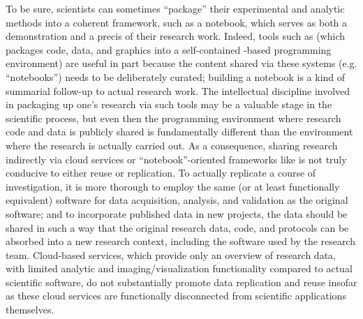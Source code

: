 \documentclass[11pt,letterpaper]{article}
\newcommand{\Jupyter}{\resizebox{!}{7pt}{\AcronymText{Jupyter}}}
\newcommand{\Python}{\resizebox{!}{7pt}{\AcronymText{Python}}}
\newcommand{\textscc}[1]{{\color{orr!35!black}{{%
						\fontfamily{Cabin-TLF}\fontseries{b}\selectfont{\textsc{\scriptsize{#1}}}}}}}
\newcommand{\AcronymText}[1]{{\textscc{#1}}}
\newcommand{\p}[1]{

\vspace{1em}#1}
\newcommand{\q}[1]{{\fontfamily{qcr}\selectfont ``}#1{\fontfamily{qcr}\selectfont ''}}
\begin{document}
{\p{To be sure, scientists can sometimes 
\q{package} their experimental and analytic 
methods into a coherent framework, such as a 
\Jupyter{} notebook, which serves as both a 
demonstration and a precis of their 
research work.  Indeed, tools such 
as \Jupyter{} (which packages code, data, 
and graphics into a self-contained \Python{}-based 
programming environment) are useful in part 
because the content shared via these 
systems (e.g. \Jupyter{} \q{notebooks}) needs 
to be deliberately curated; building a 
notebook is a kind of summarial follow-up to 
actual research work.  The intellectual discipline 
involved in packaging up one's research via 
such tools may be a valuable stage in the 
scientific process, but even then the programming 
environment where research code and data 
is publicly shared is fundamentally different 
than the environment where the research is 
actually carried out.  As a consequence, 
sharing research indirectly via cloud 
services or \q{notebook}-oriented 
frameworks like \Jupyter{} is not truly 
conducive to either reuse or replication.  
To actually replicate a course of 
investigation, it is more thorough 
to employ the same (or at least 
functionally equivalent) software for 
data acquisition, analysis, and validation 
as the original software; and to incorporate 
published data in new projects, the data 
should be shared in such a way that 
the original research data, code, and 
protocols can be absorbed into a new 
research context, including the software 
used by the research team.  Cloud-based 
services, which provide only an overview 
of research data, with limited analytic 
and imaging/visualization functionality 
compared to actual scientific software, 
do not substantially promote data 
replication and reuse insofar as 
these cloud services are functionally 
disconnected from scientific applications 
themselves.}

}
\end{document}
